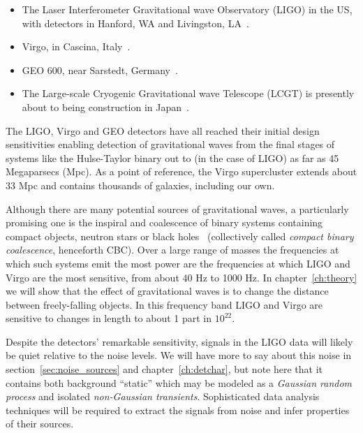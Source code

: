 \begin{itemize}

\item The Laser Interferometer Gravitational wave Observatory (LIGO)
in the US, with detectors in Hanford, WA and Livingston,
LA~\cite{Sigg:2008}.

\item Virgo, in Cascina, Italy~\cite{Acernese:2008}.

\item GEO 600, near Sarstedt, Germany~\cite{Grote:2008}.

\item The Large-scale Cryogenic Gravitational wave Telescope (LCGT) is
presently about to being construction in
Japan~\cite{0264-9381-27-8-084004}.
\end{itemize}

The LIGO, Virgo and GEO detectors have all reached their initial
design sensitivities enabling detection of gravitational waves from
the final stages of systems like the Hulse-Taylor binary out to (in
the case of LIGO) as far as 45 Megaparsecs (Mpc).  As a point of
reference, the Virgo supercluster extends about 33 Mpc and contains
thousands of galaxies, including our own.

Although there are many potential sources of gravitational waves, a
particularly promising one is the inspiral and coalescence of binary
systems containing compact objects, neutron stars or black
holes~\cite{thorne.k:1987} (collectively called \emph{compact binary
coalescence}, henceforth CBC).  Over a large range of masses the
frequencies at which such systems emit the most power are the
frequencies at which LIGO and Virgo are the most sensitive, from about
40 Hz to 1000 Hz.  In chapter~\ref{ch:theory} we will show that the
effect of gravitational waves is to change the distance between
freely-falling objects.  In this frequency band LIGO and Virgo are
sensitive to changes in length to about 1 part in $10^22$.

Despite the detectors' remarkable sensitivity, signals in the LIGO
data will likely be quiet relative to the noise levels.  We will have
more to say about this noise in section~\ref{sec:noise_sources} and
chapter~\ref{ch:detchar}, but note here that it contains both
background ``static'' which may be modeled as a \emph{Gaussian random
process} and isolated \emph{non-Gaussian transients}.  Sophisticated
data analysis techniques will be required to extract the signals from
noise and infer properties of their sources.


